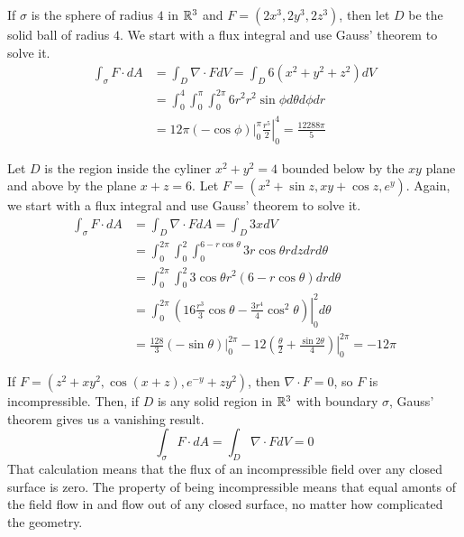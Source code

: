 \documentclass[fleqn,letterpaper]{report}
\begin{document}
\begin{example} 
If $\sigma$ is the sphere of radius $4$ in $\mathbb{R}^3$ and $F =
(2x^3, 2y^3, 2z^3)$, then let $D$ be the solid ball of radius
$4$. We start with a flux integral and use Gauss' theorem to
solve it.
\begin{align*}
\int_\sigma F \cdot dA & = \int_D \nabla \cdot F dV = \int_D 6 (x^2 + y^2
+ z^2) dV \\
& = \int_0^4 \int_0^{\pi} \int_0^{2\pi} 6 r^2 r^2 \sin \phi
d\theta d \phi dr \\
& = 12\pi \left. ( -\cos \phi ) \right|_0^{\pi} \left.
\frac{r^5}{2} \right|_0^4 = \frac{12288\pi}{5} 
\end{align*}
\end{example}

\begin{example}
Let $D$ is the region inside the cyliner $x^2 + y^2 = 4$
bounded below by the $xy$ plane and above by the plane
$x+z=6$. Let $F = (x^2 + \sin z, xy + \cos z, e^y)$. Again, we
start with a flux integral and use Gauss' theorem to solve it.
\begin{align*}
\int_{\sigma} F \cdot dA & = \int_D \nabla \cdot F dA = \int_D
3x dV \\
& = \int_0^{2\pi} \int_0^2 \int_0^{6-r\cos \theta} 3 r \cos
\theta r dz dr d\theta \\
& = \int_0^{2\pi} \int_0^2 3 \cos \theta r^2 (6-r\cos \theta)
dr d\theta \\
& = \int_0^{2\pi} \left. \left( 16 \frac{r^3}{3} \cos \theta -
\frac{3r^4}{4} \cos^2 \theta \right) \right|_0^2 d \theta \\
& = \frac{128}{3} \left. ( -\sin \theta) \right|_0^{2\pi} - 12
\left. \left( \frac{\theta}{2} + \frac{\sin 2\theta}{4}
\right) \right|_0^{2\pi} = -12\pi
\end{align*}
\end{example}

\begin{example}
If $F = (z^2 + xy^2, \cos(x+z), e^{-y} + zy^2)$, then $\nabla
\cdot F = 0$, so $F$ is incompressible. Then, if $D$ is any
solid region in $\mathbb{R}^3$ with boundary $\sigma$, Gauss' theorem
gives us a vanishing result.
\begin{equation*}
\int_{\sigma} F \cdot dA = \int_D \nabla \cdot F dV = 0
\end{equation*}
That calculation means that the flux of an incompressible
field over any closed surface is zero. The property of being
incompressible means that equal amonts of the field flow in
and flow out of any closed surface, no matter how complicated
the geometry. 
\end{example}
\end{document}
